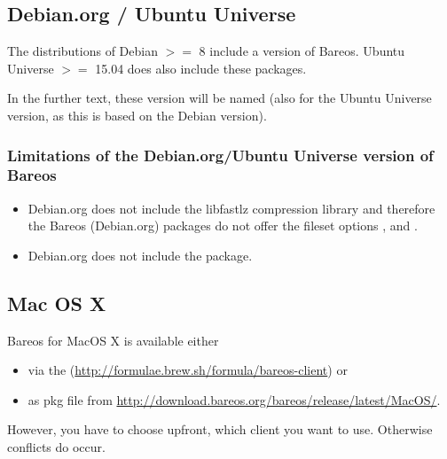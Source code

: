 \subsection{Debian.org / Ubuntu Universe}
\label{sec:DebianOrg}

The distributions of Debian $>=$ 8 include a version of Bareos.
Ubuntu Universe $>=$ 15.04 does also include these packages. 

In the further text, these version will be named  
(also for the Ubuntu Universe version, as this is based on the Debian version).

\subsubsection{Limitations of the Debian.org/Ubuntu Universe version of Bareos}
\label{sec:DebianOrgLimitations}

    \begin{itemize}
        \item Debian.org does not include the libfastlz compression library and therefore the Bareos (Debian.org) packages do not offer the fileset options ,  and .
        \item Debian.org does not include the  package.
    \end{itemize}


\subsection{Mac OS X}
\label{sec:macosx}

Bareos for MacOS X is available either

\begin{itemize}
  \item via the  (\url{http://formulae.brew.sh/formula/bareos-client}) or
  \item as pkg file from \url{http://download.bareos.org/bareos/release/latest/MacOS/}.
\end{itemize}


However, you have to choose upfront, which client you want to use. Otherwise conflicts do occur.

